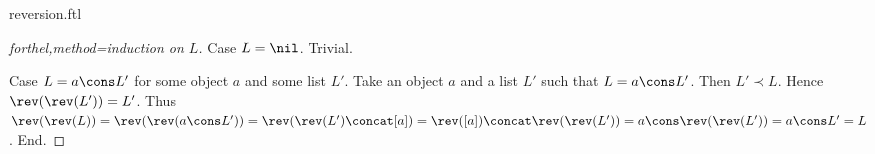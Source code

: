 \documentclass{naproche-library}
\begin{document}
\begin{smodule}{reversion.ftl}
\begin{proof}[forthel,method=induction on $L$]
    Case $L = \nil$. Trivial.
  
    Case $L = a \cons L'$ for some object $a$ and some list $L'$.
      Take an object $a$ and a list $L'$ such that $L = a \cons L'$.
      Then $L' \prec L$.
      Hence $\rev(\rev(L')) = L'$.
      Thus $\rev(\rev(L))
        = \rev(\rev(a \cons L'))
        = \rev(\rev(L') \concat [a])
        = \rev([a]) \concat \rev(\rev(L'))
        = a \cons \rev(\rev(L'))
        = a \cons L'
        = L$.
    End.
  \end{proof}
\end{smodule}
\end{document}
